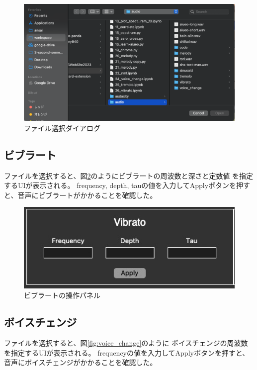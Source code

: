 \documentclass[a4paper,11pt]{jsarticle}
\begin{document}
\begin{figure}[h]
\centering
\includegraphics[keepaspectratio, width=13cm]
{./images/file_select_dialog.png}
\caption{ファイル選択ダイアログ}
\label{fig:file_select_dialog}
\end{figure}

\subsection{ビブラート}
ファイルを選択すると、図\ref{fig:vibrato}のようにビブラートの周波数と深さと定数値
を指定するUIが表示される。
frequency, depth, tauの値を入力してApplyボタンを押すと、音声にビブラートがかかることを確認した。

\begin{figure}[h]
\centering
\includegraphics[keepaspectratio, width=13cm]
{./images/vibrato.jpg}
\caption{ビブラートの操作パネル}
\label{fig:vibrato}
\end{figure}

\subsection{ボイスチェンジ}
ファイルを選択すると、図\ref{fig:voice_change}のように
ボイスチェンジの周波数を指定するUIが表示される。
frequencyの値を入力してApplyボタンを押すと、音声にボイスチェンジがかかることを確認した。
\end{document}
